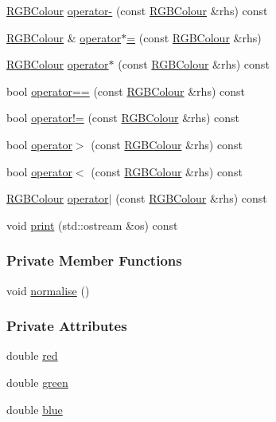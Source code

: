 \begin{DoxyCompactItemize}
\item 
\hyperlink{classRGBColour}{\-R\-G\-B\-Colour} \hyperlink{classRGBColour_a1269d240b66c9981ab0ff605b6b3483b}{operator-\/} (const \hyperlink{classRGBColour}{\-R\-G\-B\-Colour} \&rhs) const 
\item 
\hyperlink{classRGBColour}{\-R\-G\-B\-Colour} \& \hyperlink{classRGBColour_aafad94bdb3150ed9878bb892bdb03930}{operator$\ast$=} (const \hyperlink{classRGBColour}{\-R\-G\-B\-Colour} \&rhs)
\item 
\hyperlink{classRGBColour}{\-R\-G\-B\-Colour} \hyperlink{classRGBColour_acd5eabcef1f0adedabf00d1353d3e14a}{operator$\ast$} (const \hyperlink{classRGBColour}{\-R\-G\-B\-Colour} \&rhs) const 
\item 
bool \hyperlink{classRGBColour_a3d7f923865e6584ec5c543ab253b0a64}{operator==} (const \hyperlink{classRGBColour}{\-R\-G\-B\-Colour} \&rhs) const 
\item 
bool \hyperlink{classRGBColour_a3154f056ae4dace6a72abb09fa414ce1}{operator!=} (const \hyperlink{classRGBColour}{\-R\-G\-B\-Colour} \&rhs) const 
\item 
bool \hyperlink{classRGBColour_a1f18a409ee0f924d92705a8489b68a8d}{operator$>$} (const \hyperlink{classRGBColour}{\-R\-G\-B\-Colour} \&rhs) const 
\item 
bool \hyperlink{classRGBColour_a8ba92041934e0d967034870dba3d694c}{operator$<$} (const \hyperlink{classRGBColour}{\-R\-G\-B\-Colour} \&rhs) const 
\item 
\hyperlink{classRGBColour}{\-R\-G\-B\-Colour} \hyperlink{classRGBColour_ab90fbbf0cdd95bea8a3ded697a251ec8}{operator$|$} (const \hyperlink{classRGBColour}{\-R\-G\-B\-Colour} \&rhs) const 
\item 
void \hyperlink{classRGBColour_aca18467cf41ca1c718d14d505955f316}{print} (std\-::ostream \&os) const 
\end{DoxyCompactItemize}
\subsubsection*{\-Private \-Member \-Functions}
\begin{DoxyCompactItemize}
\item 
void \hyperlink{classRGBColour_a6c3021deda4ea0283b3e19bf57629ee8}{normalise} ()
\end{DoxyCompactItemize}
\subsubsection*{\-Private \-Attributes}
\begin{DoxyCompactItemize}
\item 
double \hyperlink{classRGBColour_a459ad477ba571d1749e68c5d57869913}{red}
\item 
double \hyperlink{classRGBColour_a5530e8f8b209d95c3b2c3127c62676e1}{green}
\item 
double \hyperlink{classRGBColour_a60f32f30efb99da74e903b3876b6f161}{blue}
\end{DoxyCompactItemize}
